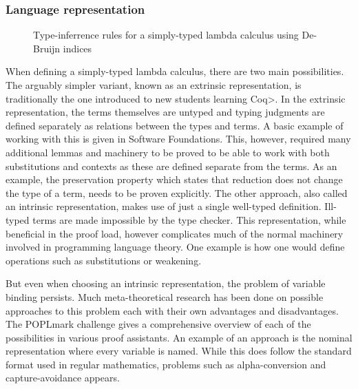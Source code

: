 \documentclass[11pt, final]{article}
\begin{document}
\subsubsection{Language representation}
\label{sec:language_repr}

\begin{figure}
  \label{fig:stlc_infer}
  \caption{Type-inferrence rules for a simply-typed lambda calculus using De-Bruijn indices}
\end{figure}

When defining a simply-typed lambda calculus, there are two main possibilities\cite{plfa2019}.
The arguably simpler variant, known as an extrinsic representation, is traditionally the one introduced to new students learning \<Coq>.
In the extrinsic representation, the terms themselves are untyped and typing judgments are defined separately as relations between the types and terms. A basic example of working with this is given in Software Foundations\cite{Pierce:SF2}.
This, however, required many additional lemmas and machinery to be proved to be able to work with both substitutions and contexts as these are defined separate from the terms.
As an example, the preservation property which states that reduction does not change the type of a term, needs to be proven explicitly.
The other approach, also called an intrinsic representation, makes use of just a single well-typed definition.
Ill-typed terms are made impossible by the type checker.
This representation, while beneficial in the proof load, however complicates much of the normal machinery involved in programming language theory.
One example is how one would define operations such as substitutions or weakening.

But even when choosing an intrinsic representation, the problem of variable binding persists.
Much meta-theoretical research has been done on possible approaches to this problem each with their own advantages and disadvantages.
The POPLmark challenge gives a comprehensive overview of each of the possibilities in various proof assistants\cite{Aydemir2005}.
An example of an approach is the nominal representation where every variable is named.
While this does follow the standard format used in regular mathematics, problems such as alpha-conversion and capture-avoidance appears.
\end{document}
